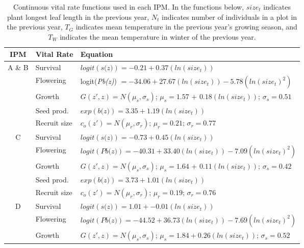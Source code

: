 \documentclass[12pt, letterpaper]{article}
\begin{document}
\begin{spacing}{1.3}
    \begin{longtable}[ht!]{c|l|p{}}
    \caption{Continuous vital rate functions used in each IPM. In the functions below, $size_t$ indicates plant longest leaf length in the previous year, $N_t$ indicates number of individuals in a plot in the previous year, $T_G$ indicates mean temperature in the previous year's growing season, and $T_W$ indicates the mean temperature in winter of the previous year. 
    \label{tab:VitalRateFunctions}} \\
    \rowcolor[gray]{.95} IPM & Vital Rate & Equation  \\
        \hline
        A \& B & Survival  &   $logit(\textit{s(z)}) = -0.21 + 0.37 (ln(size_t)) $ \\
         \rowcolor[gray]{.95}& Flowering  & logit(\textit{Pb(z)})  $= -34.06 + 27.67(ln(size_t)) -5.78 (ln(size_t)^2)$ \\
         & Growth  &  $G(z',z) = N(\mu_s, \sigma_s)$; $\mu_s = 1.57$ + $0.18 (ln(size_t))$; $\sigma_s = 0.51$\\
         \rowcolor[gray]{.95}& Seed prod.  & $exp(\textit{b(z)}) = 3.35 + 1.19 (ln(size_t))$  \\
         & Recruit size  &  $c_o(z') = N(\mu_r, \sigma_r)$; $\mu_r = 0.21$; $\sigma_r = 0.77$ \\
         \hline
        \rowcolor[gray]{.95}C &   Survival  &   $logit(\textit{s(z)}) = -0.73 + 0.45 (ln(size_t)) $ \\
         & Flowering  & $logit(\textit{Pb(z)})  = -40.31 + 33.40(ln(size_t)) -7.09 (ln(size_t)^2)$ \\
         \rowcolor[gray]{.95}& Growth  &  $G(z',z) = N(\mu_s, \sigma_s)$; $\mu_s = 1.64$ + $0.11 (ln(size_t))$; $\sigma_s = 0.42$\\
         & Seed prod.  & $exp(\textit{b(z)}) = 3.73 + 1.01 (ln(size_t))$  \\
         \rowcolor[gray]{.95}& Recruit size  &  $c_o(z') = N(\mu_r, \sigma_r)$; $\mu_r = 0.19$; $\sigma_r = 0.76$ \\
         \hline
        D &  Survival  &   $logit(\textit{s(z)}) = 1.01 + -0.01 (ln(size_t)) $ \\
         \rowcolor[gray]{.95}& Flowering  & $logit(\textit{Pb(z)})  = -44.52 + 36.73(ln(size_t)) -7.69 (ln(size_t)^2)$ \\
         & Growth  &  $G(z',z) = N(\mu_s, \sigma_s)$; $\mu_s = 1.84 + 0.26(ln(size_t))$; $\sigma_s = 0.52$\\

\end{longtable}
\end{spacing}
\end{document}
